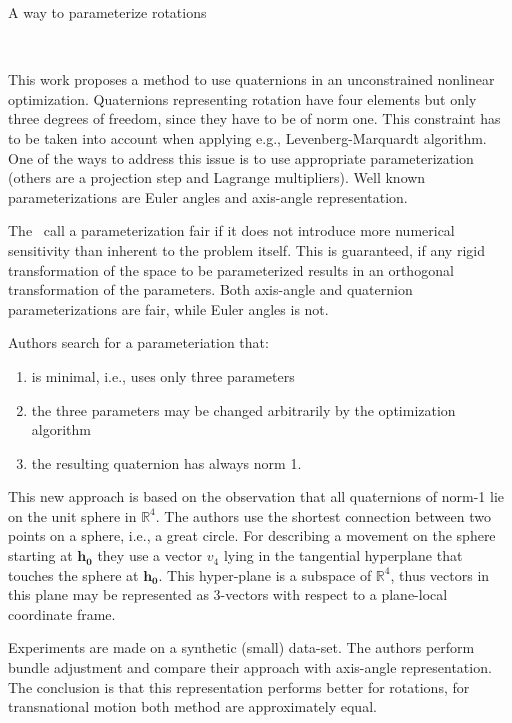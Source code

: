 \documentclass[10pt]{article}         %
\begin{document}
\begin{enumerate}
  {\Large \item A way to parameterize rotations}~\cite{schmidt2001using}

  This work proposes a method to use quaternions in an unconstrained
  nonlinear optimization.  Quaternions representing rotation have four
  elements but only three degrees of freedom, since they have to be of
  norm one.  This constraint has to be taken into account when
  applying e.g., Levenberg-Marquardt algorithm.  One of the ways to
  address this issue is to use appropriate parameterization (others
  are a projection step and Lagrange multipliers). Well known
  parameterizations are Euler angles and axis-angle representation.

  The~\cite{hornegger1999representation} call a parameterization fair if
  it does not introduce more numerical sensitivity than inherent to
  the problem itself.  This is guaranteed, if any rigid transformation
  of the space to be parameterized results in an orthogonal
  transformation of the parameters.  Both axis-angle and quaternion
  parameterizations are fair, while Euler angles is not.

  Authors search for a parameteriation that:
  \begin{enumerate}
  \item is minimal, i.e., uses only three parameters
  \item the three parameters may be changed arbitrarily by the
    optimization algorithm
  \item the resulting quaternion has always norm 1.
  \end{enumerate}

  This new approach is based on the observation that all quaternions
  of norm-1 lie on the unit sphere in $\mathbb{R}^4$.  The authors use
  the shortest connection between two points on a sphere, i.e., a great
  circle.  For describing a movement on the sphere starting at
  $\mathbf{h_0}$ they use a vector $v_4$ lying in the tangential
  hyperplane that touches the sphere at $\mathbf{h_0}$. This
  hyper-plane is a subspace of $\mathbb{R}^4$, thus vectors in this
  plane may be represented as 3-vectors with respect to a plane-local
  coordinate frame.

  Experiments are made on a synthetic (small) data-set.  The authors
  perform bundle adjustment and compare their approach with axis-angle
  representation.  The conclusion is that this representation performs
  better for rotations, for transnational motion both method are
  approximately equal.


\end{enumerate}
\end{document}
